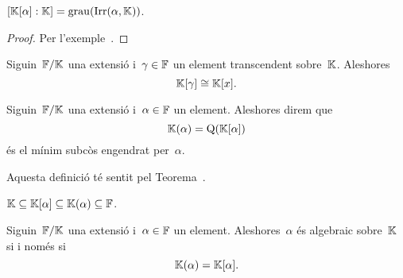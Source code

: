 \documentclass[../../main.tex]{subfiles}
\begin{document}
    \begin{corollary}
        \label{cor:grau d'un mínim subanell engendrat per un element d'una extensió}
        \([\mathbb{K}[\alpha]:\mathbb{K}]=\operatorname{grau}(\operatorname{Irr}(\alpha,\mathbb{K}))\).
    \end{corollary}
    \begin{proof}
        Per l'exemple~.
    \end{proof}
    \begin{corollary}
        \label{cor:el mínim subanell engendrat per un transcendent és isomorfa a l'anell de polinomis}
        Siguin~\(\mathbb{F}/\mathbb{K}\) una extensió i~\(\gamma\in\mathbb{F}\) un element transcendent sobre~\(\mathbb{K}\).
        Aleshores
        \[
            \mathbb{K}[\gamma]\cong\mathbb{K}[x].
        \]
    \end{corollary}
    \begin{definition}
        \label{def:mínim subcòs engendrat per un element d'una extensió}
        Siguin~\(\mathbb{F}/\mathbb{K}\) una extensió i~\(\alpha\in\mathbb{F}\) un element.
        Aleshores direm que
        \[
            \mathbb{K}(\alpha)=\operatorname{Q}(\mathbb{K}[\alpha])
        \]
        és el mínim subcòs engendrat per~\(\alpha\).

        Aquesta definició té sentit pel Teorema~.
    \end{definition}
    \begin{observation}
        \label{obs:inclusió del mínim subanell i subcòs engendrats per un element}
        \(\mathbb{K}\subseteq\mathbb{K}[\alpha]\subseteq\mathbb{K}(\alpha)\subseteq\mathbb{F}\).
    \end{observation}
    \begin{lemma}
        \label{lema:un element és algebraic si i només si el mínim subanell engendrat per l'element és un cos}
        Siguin~\(\mathbb{F}/\mathbb{K}\) una extensió i~\(\alpha\in\mathbb{F}\) un element.
        Aleshores~\(\alpha\) és algebraic sobre~\(\mathbb{K}\) si i només si
        \[
            \mathbb{K}(\alpha)=\mathbb{K}[\alpha].
        \]
    \end{lemma}
\end{document}
